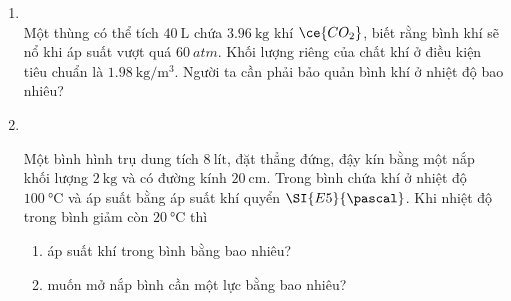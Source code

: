 \begin{enumerate}[label=\bfseries Câu \arabic*:, leftmargin=1.7cm]
\item {}\\
Một thùng có thể tích $\SI{40}{\liter}$ chứa $\SI{3.96}{\kilogram}$ khí $\ce{CO_2}$, biết rằng bình khí sẽ nổ khi áp suất vượt quá $\SI{60}{atm}$. Khối lượng riêng của chất khí ở điều kiện tiêu chuẩn là $\SI{1.98}{\kilogram/\meter^3}$. Người ta cần phải bảo quản bình khí ở nhiệt độ bao nhiêu?

\item {}\\
{Một bình hình trụ dung tích $\SI{8}{\text{lít}}$, đặt thẳng đứng, đậy kín bằng một nắp khối lượng $\SI{2}{\kilogram}$ và có đường kính $\SI{20}{\centi\meter}$. Trong bình chứa khí ở nhiệt độ $\SI{100}{\celsius}$ và áp suất bằng áp suất khí quyển $\SI{E5}{\pascal}$. Khi nhiệt độ trong bình giảm còn $\SI{20}{\celsius}$ thì
	\begin{enumerate}[label=\alph*)]
		\item áp suất khí trong bình bằng bao nhiêu?
		\item muốn mở nắp bình cần một lực bằng bao nhiêu?
	\end{enumerate}
	
}
\end{enumerate}
